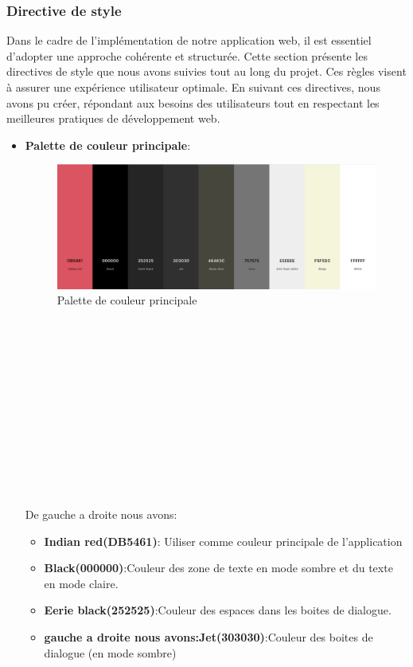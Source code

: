 \documentclass[a4paper,12pt]{report}
\begin{document}
\subsubsection{Directive de style}
Dans le cadre de l'implémentation de notre application web, il est essentiel d'adopter une approche cohérente et structurée. Cette section présente les directives de style que nous avons suivies tout au long du projet. Ces règles visent à assurer une expérience utilisateur optimale. En suivant ces directives, nous avons pu créer, répondant aux besoins des utilisateurs tout en respectant les meilleures pratiques de développement web.
\begin{itemize}
  \item\textbf{Palette de couleur principale}:
  \begin{figure}[h!]
    \includegraphics[width=1\textwidth]{./images/getdo-color-palette.png}
    \caption{Palette de couleur principale}
    \label{fig:jira_project_task}
  \end{figure}\\ \\ \\ \\ \\ \\ \\ \\ \\ \\ \\ \\
 De gauche a droite nous avons:
  \begin{itemize}
    \item\textbf{Indian red(DB5461)}: Uiliser comme couleur principale de l'application
    \item\textbf{Black(000000)}:Couleur des zone de texte en mode sombre et du texte en mode claire.
    \item\textbf{Eerie black(252525)}:Couleur des espaces dans les boites de dialogue.
    \item\textbf{gauche a droite nous avons:Jet(303030)}:Couleur des boites de dialogue (en mode sombre)

\end{itemize}
\end{itemize}
\end{document}
